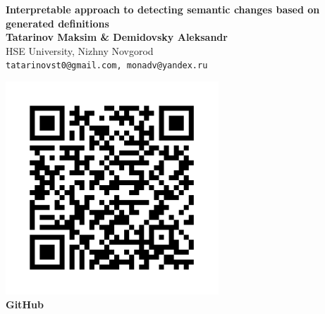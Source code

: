 \documentclass[a0,portrait]{a0poster}
\begin{document}


\begin{minipage}[b]{0.9\linewidth}
\huge \color{NavyBlue} \textbf{Interpretable approach to detecting semantic changes based on generated definitions} \color{Black}\\[0.2cm] %
\huge \textbf{Tatarinov Maksim \& Demidovsky Aleksandr}\\[0.3cm] %
\Large HSE University, Nizhny Novgorod\\[0.2cm] %
\Large \texttt{tatarinovst0@gmail.com, monadv@yandex.ru}
\end{minipage}
\hspace*{1cm}
%
\begin{minipage}[b]{0.1\linewidth}
\centering
\includegraphics[width=8cm]{img/frame}\\
\textbf{GitHub}
\end{minipage}


\end{document}
